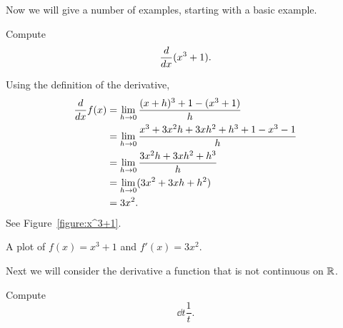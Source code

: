 Now we will give a number of examples, starting with a basic example.

\begin{example}
Compute 
\[
\frac{d}{dx} (x^3 + 1).
\] 
\end{example}

\begin{solution}
Using the definition of the derivative,
\begin{align*}
\frac{d}{dx} f(x) &= \lim_{h\to 0}\frac{(x+h)^3 + 1 - (x^3 +1)}{h}\\
&= \lim_{h\to 0}\frac{x^3+3x^2h+3xh^2 + h^3 + 1 - x^3 -1}{h}\\
&= \lim_{h\to 0}\frac{3x^2h+3xh^2 + h^3}{h}\\
&= \lim_{h\to 0}(3x^2+3xh + h^2)\\
&= 3x^2.
\end{align*}
See Figure~\ref{figure:x^3+1}.
\end{solution}
\begin{marginfigure}[0in]
\caption{A plot of $f(x) = x^3+1$ and $f'(x) = 3x^2$.}
\label{figure:x^3+1}
\end{marginfigure}


Next we will consider the derivative a function that is not continuous
on $\mathbb{R}$.


\begin{example}
Compute
\[
\dd t \frac{1}{t}.
\]
\end{example}

